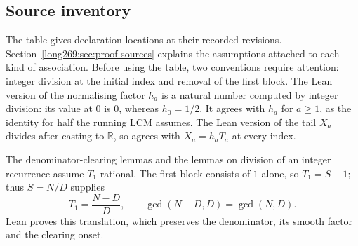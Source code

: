 \subsection{Source inventory}\label{long269:long:sources}

The table gives declaration locations at their recorded revisions.
Section~\ref{long269:sec:proof-sources} explains the assumptions attached
to each kind of association. Before using the table, two conventions
require attention: integer division at the initial index and removal of
the first block. The Lean version of
the normalising factor $h_a$ is a natural number computed by integer division:
its value at $0$ is $0$, whereas $h_0=1/2$.  It agrees with $h_a$ for
$a\ge1$, as the identity for half the running LCM assumes.  The Lean version of the
tail $X_a$ divides after casting to $\mathbb R$, so agrees with
$X_a=h_aT_a$ at every index.

The denominator-clearing lemmas and the lemmas on division of an integer recurrence assume $T_1$ rational.
The first block consists of $1$ alone, so $T_1=S-1$; thus $S=N/D$ supplies
\[
 T_1=\frac{N-D}{D},\qquad \gcd(N-D,D)=\gcd(N,D).
\]
Lean proves this translation, which preserves the denominator, its
smooth factor and the clearing onset.

